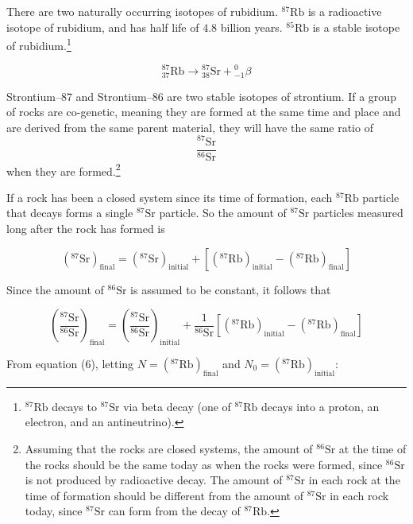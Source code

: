 \documentclass[11pt]{article}
\begin{document}
There are two naturally occurring isotopes of rubidium. $^{87}\mathrm{Rb}$ is a radioactive isotope of rubidium, and has half life of $4.8$ billion years. $^{85}\mathrm{Rb}$ is a stable isotope of rubidium.\footnote{$^{87}\mathrm{Rb}$ decays to $^{87}\mathrm{Sr}$ via beta decay (one of $^{87}\mathrm{Rb}$ decays into a proton, an electron, and an antineutrino).}

\[
{}^{87}_{37}\mathrm{Rb}
\rightarrow
{}^{87}_{38}\mathrm{Sr}
+
{}^{0}_{-1}\beta
\]

Strontium--87 and Strontium--86 are two stable isotopes of strontium. If a group of rocks are co-genetic, meaning they are formed at the same time and place and are derived from the same parent material, they will have the same ratio of
\[
\frac{^{87}\mathrm{Sr}}{^{86}\mathrm{Sr}}
\]
when they are formed.\footnote{Assuming that the rocks are closed systems, the amount of $^{86}\mathrm{Sr}$ at the time of the rocks should be the same today as when the rocks were formed, since $^{86}\mathrm{Sr}$ is not produced by radioactive decay. The amount of $^{87}\mathrm{Sr}$ in each rock at the time of formation should be different from the amount of $^{87}\mathrm{Sr}$ in each rock today, since $^{87}\mathrm{Sr}$ can form from the decay of $^{87}\mathrm{Rb}$.}

If a rock has been a closed system since its time of formation, each $^{87}\mathrm{Rb}$ particle that decays forms a single $^{87}\mathrm{Sr}$ particle. So the amount of $^{87}\mathrm{Sr}$ particles measured long after the rock has formed is

\begin{equation}
\left(^{87}\mathrm{Sr}\right)_{\mathrm{final}}
=
\left(^{87}\mathrm{Sr}\right)_{\mathrm{initial}}
+
\left[\left(^{87}\mathrm{Rb}\right)_{\mathrm{initial}}-\left(^{87}\mathrm{Rb}\right)_{\mathrm{final}}\right]
\end{equation}

Since the amount of $^{86}\mathrm{Sr}$ is assumed to be constant, it follows that

\begin{equation}
\left(\frac{^{87}\mathrm{Sr}}{^{86}\mathrm{Sr}}\right)_{\mathrm{final}}
=
\left(\frac{^{87}\mathrm{Sr}}{^{86}\mathrm{Sr}}\right)_{\mathrm{initial}}
+
\frac{1}{^{86}\mathrm{Sr}}
\left[
\left(^{87}\mathrm{Rb}\right)_{\mathrm{initial}}
-
\left(^{87}\mathrm{Rb}\right)_{\mathrm{final}}
\right]
\end{equation}

From equation (6), letting $N=\left(^{87}\mathrm{Rb}\right)_{\mathrm{final}}$ and $N_0=\left(^{87}\mathrm{Rb}\right)_{\mathrm{initial}}$:
\end{document}
